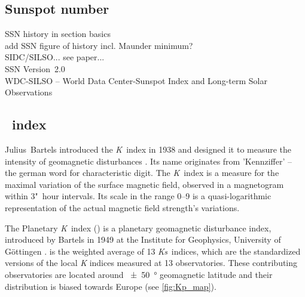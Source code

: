 \subsection{Sunspot number}
\label{sec:sunspot_number}

SSN history in section basics\\
add SSN figure of history incl. Maunder minimum?\\
SIDC/SILSO... see paper...\\
SSN Version~2.0\\
WDC-SILSO -- World Data Center-Sunspot Index and Long-term Solar Observations\\


\subsection{\Kp{}~index}
\label{sec:kp_index}
Julius~Bartels introduced the \textit{K}~index in 1938 and designed it to measure the intensity of geomagnetic disturbances \citep{Bartels1939}. Its name originates from 'Kennziffer' -- the german word for characteristic digit. The \textit{K}~index is a measure for the maximal variation of the surface magnetic field, observed in a magnetogram within 3"~hour intervals. Its scale in the range 0--9 is a quasi-logarithmic representation of the actual magnetic field strength's variations.

The Planetary \textit{K}~index (\Kp{}) is a planetary geomagnetic disturbance index, introduced by Bartels in 1949 at the Institute for Geophysics, University of Göttingen \citep{Bartels1949}. \Kp{} is the weighted average of 13 \textit{Ks}~indices, which are the standardized versions of the local \textit{K} indices measured at 13 observatories. These contributing observatories are located around \SI{+-50}{\degree} geomagnetic latitude and their distribution is biased towards Europe (see \autoref{fig:Kp_map}).
\begin{figure}[htb]
\end{figure}

